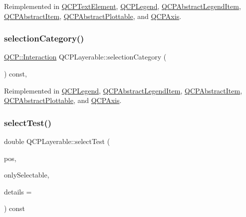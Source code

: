 Reimplemented in \hyperlink{class_q_c_p_text_element_a8d696ea82fa7bf743e01858039c03525}{Q\+C\+P\+Text\+Element}, \hyperlink{class_q_c_p_legend_a71f54a05c3e5b1a1ade1864422cd642e}{Q\+C\+P\+Legend}, \hyperlink{class_q_c_p_abstract_legend_item_a0081acfd8c4bb8ac4e9dcfe0f6c49b74}{Q\+C\+P\+Abstract\+Legend\+Item}, \hyperlink{class_q_c_p_abstract_item_aa4b969c58797f39c9c0b6c07c7869d17}{Q\+C\+P\+Abstract\+Item}, \hyperlink{class_q_c_p_abstract_plottable_a2d488568cf16600dd81fa23d7d439829}{Q\+C\+P\+Abstract\+Plottable}, and \hyperlink{class_q_c_p_axis_a50c3ed18e189d48421ec2978f88e4f87}{Q\+C\+P\+Axis}.

\mbox{\label{class_q_c_p_layerable_a908c9edda761886f33893be326dab77d}} 
\subsubsection{\texorpdfstring{selection\+Category()}{selectionCategory()}}
{\footnotesize\ttfamily \hyperlink{namespace_q_c_p_a2ad6bb6281c7c2d593d4277b44c2b037}{Q\+C\+P\+::\+Interaction} Q\+C\+P\+Layerable\+::selection\+Category (\begin{DoxyParamCaption}{ }\end{DoxyParamCaption}) const\hspace{0.3cm}{\ttfamily [protected]}, {\ttfamily [virtual]}}



Reimplemented in \hyperlink{class_q_c_p_legend_a1a2075e462984f9ff51d9c75bda3581b}{Q\+C\+P\+Legend}, \hyperlink{class_q_c_p_abstract_legend_item_af8eb0fda0e11b0a23e1051b0102c8c6a}{Q\+C\+P\+Abstract\+Legend\+Item}, \hyperlink{class_q_c_p_abstract_item_aceb5f99c361cf023c7cbe7339ea29571}{Q\+C\+P\+Abstract\+Item}, \hyperlink{class_q_c_p_abstract_plottable_af80ad8531642e786b6f4fad551c203c4}{Q\+C\+P\+Abstract\+Plottable}, and \hyperlink{class_q_c_p_axis_ab751e3e96495716a2f6742ca7d7b3d49}{Q\+C\+P\+Axis}.

\mbox{\label{class_q_c_p_layerable_a04db8351fefd44cfdb77958e75c6288e}} 
\subsubsection{\texorpdfstring{select\+Test()}{selectTest()}}
{\footnotesize\ttfamily double Q\+C\+P\+Layerable\+::select\+Test (\begin{DoxyParamCaption}\item[{const Q\+PointF \&}]{pos,  }\item[{bool}]{only\+Selectable,  }\item[{Q\+Variant $\ast$}]{details = {} }\end{DoxyParamCaption}) const\hspace{0.3cm}{\ttfamily [virtual]}}

